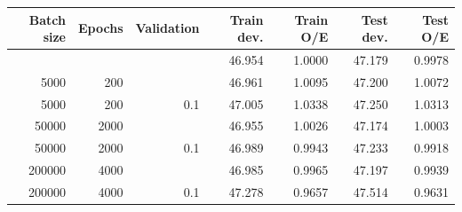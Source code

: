 \addvspace{\baselineskip}
\noindent
\begin{minipage}{\textwidth}
\label{tab:glm_keras_comparison}
\centering
\small
\setlength{\tabcolsep}{5pt}
\begin{tabular}{rrrrrrr}
\toprule
Batch size & Epochs & Validation & Train dev. & Train O/E & Test dev. & Test O/E \\
\midrule
 &  &  & 46.954 & 1.0000 & 47.179 & 0.9978 \\
5000 & 200 &  & 46.961 & 1.0095 & 47.200 & 1.0072 \\
5000 & 200 & 0.1 & 47.005 & 1.0338 & 47.250 & 1.0313 \\
50000 & 2000 &  & 46.955 & 1.0026 & 47.174 & 1.0003 \\
50000 & 2000 & 0.1 & 46.989 & 0.9943 & 47.233 & 0.9918 \\
200000 & 4000 &  & 46.985 & 0.9965 & 47.197 & 0.9939 \\
200000 & 4000 & 0.1 & 47.278 & 0.9657 & 47.514 & 0.9631 \\
\bottomrule
\end{tabular}
\end{minipage}\par
\addvspace{\baselineskip}
